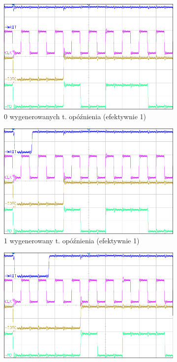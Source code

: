 \documentclass[fleqn]{article}
\begin{document}
\begin{figure}[H]
	\centering
	\begin{subfigure}[b]{0.49\textwidth}
		\includegraphics[width=\textwidth]{img/2a.png}
		\caption{0 wygenerowanych t. opóźnienia (efektywnie 1)}
		\label{fig:2a}
	\end{subfigure}
	\begin{subfigure}[b]{0.49\textwidth}
		\includegraphics[width=\textwidth]{img/2b.png}
		\caption{1 wygenerowany t. opóźnienia (efektywnie 1)}
		\label{fig:2b}
	\end{subfigure}
	\centering
	\begin{subfigure}[b]{0.49\textwidth}
		\includegraphics[width=\textwidth]{img/2c.png}

\end{subfigure}
\end{figure}
\end{document}
